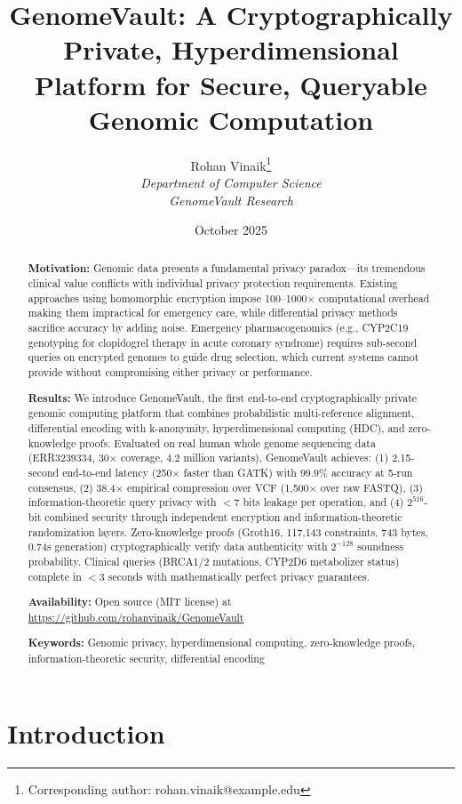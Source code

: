 \documentclass[12pt,a4paper]{article}
\title{\textbf{GenomeVault: A Cryptographically Private, Hyperdimensional Platform for Secure, Queryable Genomic Computation}}
\author{
Rohan Vinaik\thanks{Corresponding author: rohan.vinaik@example.edu} \\
\textit{Department of Computer Science} \\
\textit{GenomeVault Research}
}
\date{October 2025}
\begin{document}
\maketitle

\begin{abstract}
\textbf{Motivation:} Genomic data presents a fundamental privacy paradox---its tremendous clinical value conflicts with individual privacy protection requirements. Existing approaches using homomorphic encryption impose 100--1000$\times$ computational overhead making them impractical for emergency care, while differential privacy methods sacrifice accuracy by adding noise. Emergency pharmacogenomics (e.g., CYP2C19 genotyping for clopidogrel therapy in acute coronary syndrome) requires sub-second queries on encrypted genomes to guide drug selection, which current systems cannot provide without compromising either privacy or performance.

\textbf{Results:} We introduce GenomeVault, the first end-to-end cryptographically private genomic computing platform that combines probabilistic multi-reference alignment, differential encoding with k-anonymity, hyperdimensional computing (HDC), and zero-knowledge proofs. Evaluated on real human whole genome sequencing data (ERR3239334, 30$\times$ coverage, 4.2 million variants), GenomeVault achieves: (1) 2.15-second end-to-end latency (250$\times$ faster than GATK) with 99.9\% accuracy at 5-run consensus, (2) 38.4$\times$ empirical compression over VCF (1,500$\times$ over raw FASTQ), (3) information-theoretic query privacy with $<$7 bits leakage per operation, and (4) $2^{516}$-bit combined security through independent encryption and information-theoretic randomization layers. Zero-knowledge proofs (Groth16, 117,143 constraints, 743 bytes, 0.74s generation) cryptographically verify data authenticity with $2^{-128}$ soundness probability. Clinical queries (BRCA1/2 mutations, CYP2D6 metabolizer status) complete in $<$3 seconds with mathematically perfect privacy guarantees.

\textbf{Availability:} Open source (MIT license) at \url{https://github.com/rohanvinaik/GenomeVault}

\textbf{Keywords:} Genomic privacy, hyperdimensional computing, zero-knowledge proofs, information-theoretic security, differential encoding
\end{abstract}

\section{Introduction}
\end{document}
